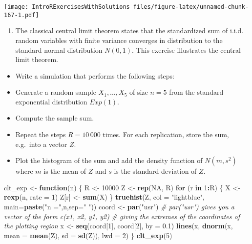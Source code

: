 \documentclass[]{article}
\newenvironment{Shaded}{\begin{snugshade}}{\end{snugshade}}
\newcommand{\KeywordTok}[1]{\textcolor[rgb]{0.13,0.29,0.53}{\textbf{#1}}}
\newcommand{\DataTypeTok}[1]{\textcolor[rgb]{0.13,0.29,0.53}{#1}}
\newcommand{\DecValTok}[1]{\textcolor[rgb]{0.00,0.00,0.81}{#1}}
\newcommand{\FloatTok}[1]{\textcolor[rgb]{0.00,0.00,0.81}{#1}}
\newcommand{\StringTok}[1]{\textcolor[rgb]{0.31,0.60,0.02}{#1}}
\newcommand{\CommentTok}[1]{\textcolor[rgb]{0.56,0.35,0.01}{\textit{#1}}}
\newcommand{\OtherTok}[1]{\textcolor[rgb]{0.56,0.35,0.01}{#1}}
\newcommand{\ControlFlowTok}[1]{\textcolor[rgb]{0.13,0.29,0.53}{\textbf{#1}}}
\newcommand{\OperatorTok}[1]{\textcolor[rgb]{0.81,0.36,0.00}{\textbf{#1}}}
\newcommand{\NormalTok}[1]{#1}
\providecommand{\tightlist}{%
  \setlength{\itemsep}{0pt}\setlength{\parskip}{0pt}}
\begin{document}
\texttt{[image: IntroRExercisesWithSolutions\_files/figure-latex/unnamed-chunk-167-1.pdf]}

\begin{enumerate}
\def\labelenumi{\arabic{enumi}.}
\setcounter{enumi}{1}
\tightlist
\item
  The classical central limit theorem states that the standardized sum
  of i.i.d. random variables with finite variance converges in
  distribution to the standard normal distribution \(N(0,1)\). This
  exercise illustrates the central limit theorem.
\end{enumerate}

\begin{itemize}
\item
  Write a simulation that performs the following steps:
\item
  Generate a random sample \(X_{1},\ldots ,X_{5}\) of size \(n=5\) from
  the standard exponential distribution \(Exp(1)\).
\item
  Compute the sample sum.
\item
  Repeat the steps \(R=10\,000\) times. For each replication, store the
  sum, e.g.~into a vector \(Z\).
\item
  Plot the histogram of the sum and add the density function of
  \(N(m,s^{2})\) where \(m\) is the mean of \(Z\) and \(s\) is the
  standard deviation of \(Z\).
\end{itemize}

\begin{Shaded}
\begin{Highlighting}[]
\NormalTok{clt_exp <-}\StringTok{ }\ControlFlowTok{function}\NormalTok{(n) \{}
\NormalTok{  R <-}\StringTok{ }\DecValTok{10000}
\NormalTok{  Z <-}\StringTok{ }\KeywordTok{rep}\NormalTok{(}\OtherTok{NA}\NormalTok{, R)}
  \ControlFlowTok{for}\NormalTok{ (r }\ControlFlowTok{in} \DecValTok{1}\OperatorTok{:}\NormalTok{R) \{}
\NormalTok{      X <-}\StringTok{ }\KeywordTok{rexp}\NormalTok{(n, }\DataTypeTok{rate =} \DecValTok{1}\NormalTok{)}
\NormalTok{      Z[r] <-}\StringTok{ }\KeywordTok{sum}\NormalTok{(X)}
\NormalTok{  \}}
  \KeywordTok{truehist}\NormalTok{(Z, }\DataTypeTok{col =} \StringTok{"lightblue"}\NormalTok{, }\DataTypeTok{main=}\KeywordTok{paste}\NormalTok{(}\StringTok{"n ="}\NormalTok{,n,}\DataTypeTok{sep=}\StringTok{" "}\NormalTok{))}
\NormalTok{  coord <-}\StringTok{ }\KeywordTok{par}\NormalTok{(}\StringTok{"usr"}\NormalTok{)}
  \CommentTok{# par("usr") gives you a vector of the form c(x1, x2, y1, y2)}
  \CommentTok{# giving the extremes of the coordinates of the plotting region}
\NormalTok{  x <-}\StringTok{ }\KeywordTok{seq}\NormalTok{(coord[}\DecValTok{1}\NormalTok{], coord[}\DecValTok{2}\NormalTok{], }\DataTypeTok{by =} \FloatTok{0.1}\NormalTok{)}
  \KeywordTok{lines}\NormalTok{(x, }\KeywordTok{dnorm}\NormalTok{(x, }\DataTypeTok{mean =} \KeywordTok{mean}\NormalTok{(Z), }\DataTypeTok{sd =} \KeywordTok{sd}\NormalTok{(Z)), }\DataTypeTok{lwd =} \DecValTok{2}\NormalTok{)}
\NormalTok{\}}
\KeywordTok{clt_exp}\NormalTok{(}\DecValTok{5}\NormalTok{)  }
\end{Highlighting}
\end{Shaded}
\end{document}
